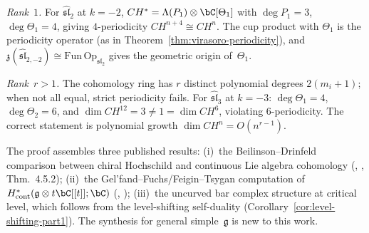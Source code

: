 \begin{remark}\label{rem:rank-distinction}
\label{rem:affine-periodicity-analysis}
\emph{Rank~$1$.}
For $\hat{\mathfrak{sl}}_2$ at $k = -2$, $CH^* = \Lambda(P_1) \otimes \bC[\Theta_1]$ with $\deg P_1 = 3$, $\deg\Theta_1 = 4$, giving $4$-periodicity $CH^{n+4} \cong CH^n$.  The cup product with $\Theta_1$ is the periodicity operator (as in Theorem~\ref{thm:virasoro-periodicity}), and $\mathfrak{z}(\hat{\mathfrak{sl}}_{2,-2}) \cong \mathrm{Fun}\,\mathrm{Op}_{\mathfrak{sl}_2}$ gives the geometric origin of~$\Theta_1$.

\emph{Rank~$r > 1$.}
The cohomology ring has $r$ distinct polynomial degrees $2(m_i + 1)$; when not all equal, strict periodicity fails.  For $\hat{\mathfrak{sl}}_3$ at $k = -3$: $\deg\Theta_1 = 4$, $\deg\Theta_2 = 6$, and $\dim CH^{12} = 3 \neq 1 = \dim CH^6$, violating $6$-periodicity.  The correct statement is polynomial growth $\dim CH^n = O(n^{r-1})$.
\end{remark}

\begin{remark}[Provenance]\label{rem:periodicity-provenance}
The proof assembles three published results:
(i)~the Beilinson--Drinfeld comparison between chiral Hochschild
and continuous Lie algebra cohomology (\ClaimStatusProvedElsewhere,
\cite{BD04}, Thm.~4.5.2);
(ii)~the Gel'fand--Fuchs/Feigin--Tsygan computation of
$H^*_{\mathrm{cont}}(\mathfrak{g} \otimes t\bC[[t]]; \bC)$
(\ClaimStatusProvedElsewhere, \cite{FT87});
(iii)~the uncurved bar complex structure at critical level, which
follows from the level-shifting self-duality
(Corollary~\ref{cor:level-shifting-part1}).
The synthesis for general simple~$\mathfrak{g}$ is new to this work.
\end{remark}

